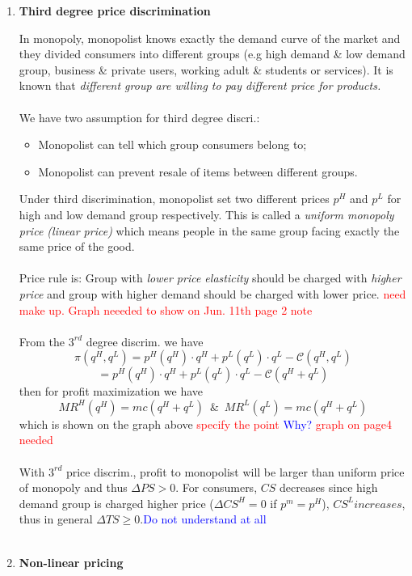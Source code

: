 \documentclass[10pt]{article}
\newenvironment{changemargin}[2]{%
  \begin{list}{}{%
    \setlength{\topsep}{0pt}%
    \setlength{\leftmargin}{#1}%
    \setlength{\rightmargin}{#2}%
    \setlength{\listparindent}{\parindent}%
    \setlength{\itemindent}{\parindent}%
    \setlength{\parsep}{\parskip}%
  }%
  \item[]}{\end{list}}
\begin{document}
\begin{changemargin}{-0.125in}{0in}
\begin{enumerate}
     \begin{enumerate}
         \item \textbf{Third degree price discrimination}
         
         \medskip
         
         In monopoly, monopolist knows exactly the demand curve of the market and they divided consumers into different groups (e.g high demand \& low demand group, business \& private users, working adult \& students or services). It is known that \textit{different group are willing to pay different price for products.} 
         \\
         \\
         We have two assumption for third degree discri.: 
         \begin{itemize}
             \item Monopolist can tell which group consumers belong to;
             \item Monopolist can prevent resale of items between different groups.
         \end{itemize}
         Under third discrimination, monopolist set two different prices $p^H$ and $p^L$ for high and low demand group respectively. This is called a \textit{uniform monopoly price (linear price)} which means people in the same group facing exactly the same price of the good.
         \\
         \\
         Price rule is: Group with \textit{lower price elasticity} should be charged with \textit{higher price} and group with higher demand should be charged with lower price. \textcolor{red}{need make up. Graph neeeded to show on Jun. 11th page 2 note}
         \\
         \\
         From the $3^{rd}$ degree discrim. we have 
         \[
         \pi(q^H,q^L) = p^H(q^H)\cdot q^H + p^L(q^L)\cdot q^L - \mathcal{C}(q^H,q^L)
         \]
         \[
         = p^H(q^H)\cdot q^H + p^L(q^L)\cdot q^L - \mathcal{C}(q^H+q^L)
         \]
         then for profit maximization we have 
         \[
         MR^H(q^H) = mc(q^H+q^L)\,\,\, \& \,\,\, MR^L(q^L) = mc(q^H+q^L)
         \]
         which is shown on the graph above \textcolor{red}{specify the point} \textcolor{blue}{Why?} \textcolor{red}{graph on page4 needed} 
         \\
         \\
         With $3^{rd}$ price discrim., profit to monopolist will be larger than uniform price of monopoly and thus $\Delta PS > 0$. For consumers, $CS$  decreases since high demand group is charged higher price ($\Delta CS^H =0$ if $p^m=p^H$), $CS^L increases$, thus in general $\Delta TS \geq 0$.\textcolor{blue}{Do not understand at all}
         \\
         \\
         \item \textbf{Non-linear pricing}
         

\end{enumerate}
\end{enumerate}
\end{changemargin}
\end{document}
